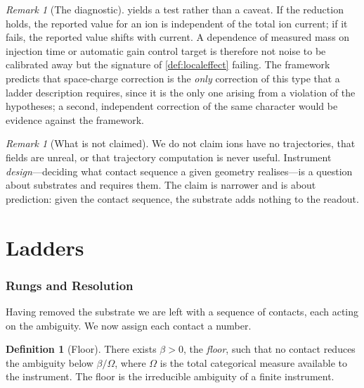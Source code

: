 \documentclass[11pt,a4paper]{article}
\theoremstyle{plain}
\theoremstyle{definition}
\newtheorem{definition}[theorem]{Definition}
\theoremstyle{remark}
\newtheorem{remark}[theorem]{Remark}
\newcommand{\flo}{\beta}
\newcommand{\Tot}{\Omega}
\begin{document}
\begin{remark}[The diagnostic]
\label{rem:diagnostic}
 yields a test rather than a caveat. If the reduction
holds, the reported value for an ion is independent of the total ion current;
if it fails, the reported value shifts with current. A dependence of measured
mass on injection time or automatic gain control target is therefore not noise
to be calibrated away but the signature of \cref{def:localeffect} failing. The
framework predicts that space-charge correction is the \emph{only} correction of
this type that a ladder description requires, since it is the only one arising
from a violation of the hypotheses; a second, independent correction of the same
character would be evidence against the framework.
\end{remark}

\begin{remark}[What is not claimed]
\label{rem:notclaimed}
We do not claim ions have no trajectories, that fields are unreal, or that
trajectory computation is never useful. Instrument \emph{design}---deciding what
contact sequence a given geometry realises---is a question about substrates and
requires them. The claim is narrower and is about prediction: given the contact
sequence, the substrate adds nothing to the readout.
\end{remark}

\part{Ladders}
\label{part:ladders}

\section{Rungs and Resolution}
\label{sec:rungs}

Having removed the substrate we are left with a sequence of contacts, each
acting on the ambiguity. We now assign each contact a number.

\begin{definition}[Floor]
\label{def:floor}
There exists $\flo > 0$, the \emph{floor}, such that no contact reduces the
ambiguity below $\flo/\Tot$, where $\Tot$ is the total categorical measure
available to the instrument. The floor is the irreducible ambiguity of a
finite instrument.
\end{definition}
\end{document}
